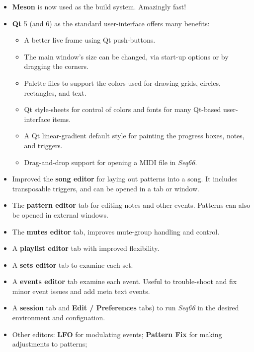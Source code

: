 \documentclass[
 11pt,
 twoside,
 a4paper,
 final                                 %
]{article}
\begin{document}
   \begin{itemize}
      \item \textbf{Meson} is now used as the build system.
         Amazingly fast!
      \item \textbf{Qt} 5 (and 6)
         as the standard user-interface offers many benefits:
         \begin{itemize}
            \item A better live frame using Qt push-buttons.
            \item The main window's size can be changed, via start-up
               options or by dragging the corners.
            \item Palette files to support the colors used for drawing
               grids, circles, rectangles, and text.
            \item Qt style-sheets for control of colors and fonts for many
               Qt-based user-interface items.
            \item A Qt linear-gradient default style for painting the
               progress boxes, notes, and triggers.
            \item Drag-and-drop support for opening a MIDI file in
               \textsl{Seq66}.
         \end{itemize}
      \item Improved the \textbf{song editor} for laying out patterns
         into a song.
         It includes transposable triggers, and
         can be opened in a tab or window.
      \item The \textbf{pattern editor} tab for editing notes and other
         events. Patterns can also be opened in external windows.
      \item The \textbf{mutes editor} tab, improves mute-group handling
         and control.
      \item A \textbf{playlist editor} tab with improved flexibility.
      \item A \textbf{sets editor} tab to examine each set.
      \item A \textbf{events editor} tab examine each event.
         Useful to trouble-shoot and fix minor event issues and
         add meta text events.
      \item A \textbf{session} tab and \textbf{Edit / Preferences}
         tabs) to run \textsl{Seq66} in the desired environment
         and configuation.
      \item Other editors: \textbf{LFO} for modulating events;
         \textbf{Pattern Fix} for making adjustments to patterns;

\end{itemize}
\end{document}
